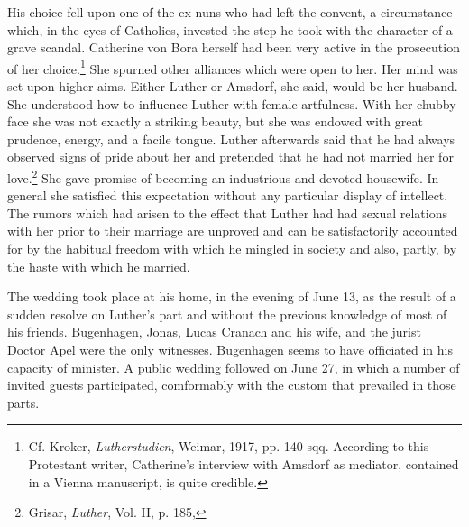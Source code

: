 His choice fell upon one of the ex-nuns who had left the convent,
a circumstance which, in the eyes of Catholics, invested the step he
took with the character of a grave scandal. Catherine von Bora herself
had been very active in the prosecution of her choice.\footnote
{Cf. Kroker, \textit{Lutherstudien}, Weimar, 1917, pp. 140 sqq. According to this Protestant
writer, Catherine’s interview with Amsdorf as mediator, contained in a Vienna manuscript,
is quite credible.}
She spurned
other alliances which were open to her. Her mind was set upon higher
aims. Either Luther or Amsdorf, she said, would be her husband. She
understood how to influence Luther with female artfulness. With
her chubby face she was not exactly a striking beauty, but she was
endowed with great prudence, energy, and a facile tongue. Luther
afterwards said that he had always observed signs of pride about her
and pretended that he had not married her for love.\footnote
{Grisar, \textit{Luther}, Vol. II, p. 185,}
She gave
promise of becoming an industrious and devoted housewife. In general
she satisfied this expectation without any particular display of
intellect. The rumors which had arisen to the effect that Luther had
had sexual relations with her prior to their marriage are unproved
and can be satisfactorily accounted for by the habitual freedom with
which he mingled in society and also, partly, by the haste with which
he married.

The wedding took place at his home, in the evening of June 13,
as the result of a sudden resolve on Luther’s part and without the
previous knowledge of most of his friends. Bugenhagen, Jonas, Lucas
Cranach and his wife, and the jurist Doctor Apel were the only witnesses.
Bugenhagen seems to have officiated in his capacity of minister. A public
wedding followed on June 27, in which a number of
invited guests participated, comformably with the custom that prevailed
in those parts.

